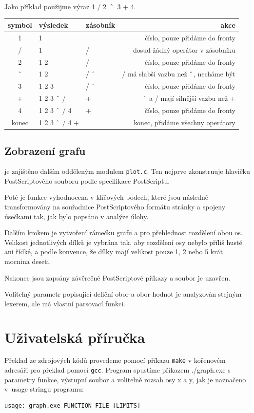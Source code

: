 \documentclass[11pt]{article}
\newcommand\CARET{\mathbin{\char`\^}}
\begin{document}
Jako příklad použijme výraz 1 / 2~$\CARET$~3 + 4.
\begin{center}
\begin{tabular}{|c|l|l|r|}
\hline
symbol & výsledek & zásobník & akce \\
\hline
1 & 1 & & číslo, pouze přidáme do fronty \\
/ & 1 & / & dosud žádný operátor v zásobníku\\
2 & 1 2 & / & číslo, pouze přidáme do fronty \\
$\CARET$ & 1 2 & / $\CARET$ & / má slabší vazbu než $\CARET$, necháme být \\
3 & 1 2 3 & / $\CARET$ & číslo, pouze přidáme do fronty \\
+ & 1 2 3 $\CARET$ / & + & $\CARET$ a / mají silnější vazbu než + \\
4 & 1 2 3 $\CARET$ / 4 & + & číslo, pouze přidáme do fronty \\
konec  & 1 2 3 $\CARET$ / 4 + & & konec, přidáme všechny operátory \\

\hline
\end{tabular}
\end{center}

\subsection{Zobrazení grafu}
je zajištěno dalším odděleným modulem \texttt{plot.c}. Ten nejprve zkonstruuje
hlavičku PostScriptového souboru podle specifikace PostScriptu. 

Poté je funkce vyhodnocena v klíčových bodech, které jsou následně
transformovány na souřadnice PostScriptového formátu stránky a spojeny úsečkami
tak, jak bylo popsáno v analýze úlohy. 

Dalším krokem je vytvoření rámečku grafu a pro přehlednost rozdělení obou os.
Velikost jednotlivých dílků je vybrána tak, aby rozdělení osy nebylo příliš
husté ani řídké, a podle konvence, že dílky mají velikost pouze 1, 2 nebo 5
krát mocnina deseti.

Nakonec jsou zapsány závěrečné PostScriptové příkazy a soubor je uzavřen.

Volitelný parametr popisující defiční obor a obor hodnot je analyzován stejným
lexerem, ale má vlastní parsovací funkci.

\section{Uživatelská příručka}
Překlad ze zdrojových kódů provedeme pomocí příkazu \texttt{make} v kořenovém
adresáři pro překlad pomocí \texttt{gcc}. Program spustíme příkazem ./graph.exe
s parametry funkce, výstupní soubor a volitelně rozsah osy x a y, jak je
naznačeno v~usage stringu programu:
\begin{verbatim}
usage: graph.exe FUNCTION FILE [LIMITS]
\end{verbatim}
\end{document}
